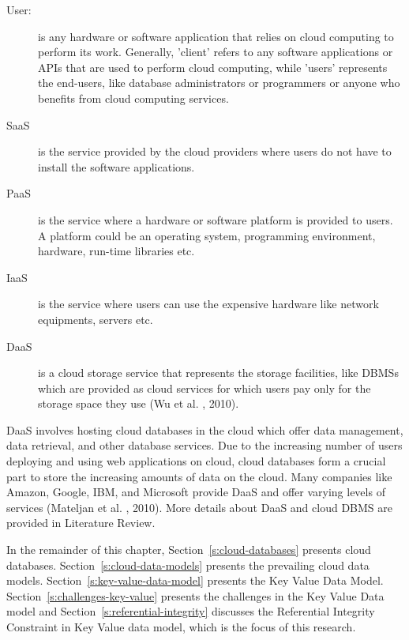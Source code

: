 \begin{description}

	\item [User:] is any hardware or software application that relies on cloud
	computing to perform its work.  Generally,   'client' refers to any software applications or
	\acp{API}  that are used to perform cloud computing,  
	while 'users' represents the end-users,   like  database administrators or
	programmers or anyone who benefits from cloud computing services. 
	
	\item [\acf{SaaS}] is the service provided by the cloud
	providers where users do not have to install the software applications. 
	
	\item [\acf{PaaS}] is the service where a hardware or
	software platform is provided to users.  A platform could be an operating system,  
	programming environment,   hardware,   run-time libraries etc. 
	
	\item [\acf{IaaS}] is the service where users can use
	the expensive hardware like network equipments,   servers etc. 
	
	\item [\acf{DaaS}] is a cloud storage service  that represents
	the storage facilities,   like  \acp{DBMS} which are provided
	as cloud services for which users pay only for the storage space they use (Wu et
	al. ,   2010). 

\end{description}


\ac{DaaS} involves hosting cloud databases in the cloud which offer data
management,   data retrieval,   and other database services.  Due to the
increasing number of users deploying and using web applications on cloud,  
cloud databases form a crucial part to store the increasing amounts of data
on the cloud.  Many companies like Amazon,   Google,   IBM,   and Microsoft
provide \ac{DaaS} and offer varying levels of services (Mateljan et al. ,   2010).  More
details about \ac{DaaS} and cloud \ac{DBMS} are provided in Literature Review. 

In the remainder of this chapter,   Section~\ref{s:cloud-databases} presents cloud
databases.  Section~\ref{s:cloud-data-models} presents the prevailing cloud data
models.  Section~\ref{s:key-value-data-model} presents the Key Value Data Model. 
Section~\ref{s:challenges-key-value} presents the challenges in the Key Value
Data model and Section~\ref{s:referential-integrity} discusses the Referential
Integrity Constraint in Key Value data model,   which is the focus of this
research. 


